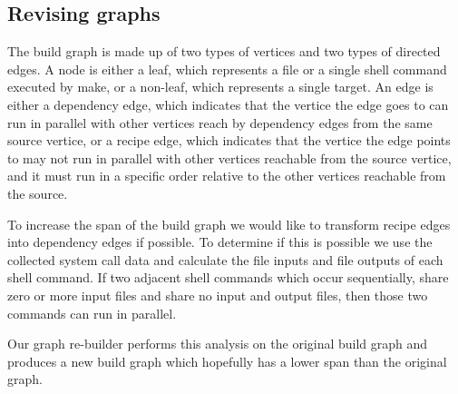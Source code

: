 \documentclass[sigplan,10pt,review,authorversion]{acmart}\settopmatter{printfolios=true,printccs=false,printacmref=false}
\begin{document}
\subsection{Revising graphs}
\label{sec:revisegraphs}

The build graph is made up of two types of vertices and two types of directed edges.  A node is
either a leaf, which represents a file or a single shell command executed by make, or a non-leaf,
which represents a single target.  An edge is either a dependency edge, which indicates that the
vertice the edge goes to can run in parallel with other vertices reach by dependency edges from the
same source vertice, or a recipe edge, which indicates that the vertice the edge points to may not
run in parallel with other vertices reachable from the source vertice, and it must run in a
specific order relative to the other vertices reachable from the source.

To increase the span of the build graph we would like to transform recipe edges into dependency
edges if possible.  To determine if this is possible we use the collected system call data and
calculate the file inputs and file outputs of each shell command.  If two adjacent shell commands
which occur sequentially, share zero or more input files and share no input and output files, then
those two commands can run in parallel.

Our graph re-builder performs this analysis on the original build graph and produces a new build
graph which hopefully has a lower span than the original graph.




\end{document}

